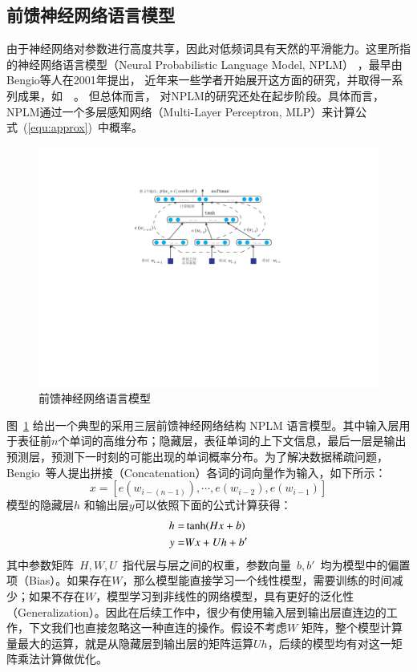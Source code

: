 \subsection{前馈神经网络语言模型}
由于神经网络对参数进行高度共享，因此对低频词具有天然的平滑能力。这里所指的神经网络语言模型（Neural Probabilistic Language Model, NPLM） ，最早由Bengio等人在2001年提出， 近年来一些学者开始展开这方面的研究，并取得一系列成果，如~\cite{DBLP:conf/acl/BaroniDK14,DBLP:journals/sigkdd/BellK07,DBLP:journals/pami/BengioCV13,DBLP:journals/tnn/BengioSF94}~。 但总体而言， 对NPLM的研究还处在起步阶段。具体而言，NPLM通过一个多层感知网络（Multi-Layer Perceptron, MLP）来计算公式~(\ref{equ:approx})~中概率。
\begin{figure}
  \centering
  \includegraphics[width=.85\linewidth]{./figures/nplm.pdf}
  \caption{前馈神经网络语言模型}\label{fig:nplm}
\end{figure}

图~\ref{fig:nplm} 给出一个典型的采用三层前馈神经网络结构 NPLM 语言模型。其中输入层用于表征前$n$个单词的高维分布；隐藏层，表征单词的上下文信息，最后一层是输出预测层，预测下一时刻的可能出现的单词概率分布。为了解决数据稀疏问题，Bengio~等人提出拼接（Concatenation）各词的词向量作为输入，如下所示：
\begin{equation}\label{equ:we}
  x = [e(w_{i-(n-1)}), \cdots , e(w_{i-2}), e{(w_{i-1})}]
\end{equation}
模型的隐藏层$h$ 和输出层$y$可以依照下面的公式计算获得：
\begin{equation}\label{equ:nplm}
\setlength{\abovedisplayskip}{6pt}
\setlength{\belowdisplayskip}{6pt}
\begin{split}
h =& \tanh(Hx+b) \\
y =&Wx + Uh +b'
\end{split}
\end{equation}
其中参数矩阵~$H,W,U$~指代层与层之间的权重，参数向量~$b,b'$~均为模型中的偏置项（Bias）。如果存在$W$，那么模型能直接学习一个线性模型，需要训练的时间减少；如果不存在$W$，模型学习到非线性的网络模型，具有更好的泛化性（Generalization）。因此在后续工作中，很少有使用输入层到输出层直连边的工作，下文我们也直接忽略这一种直连的操作。假设不考虑$W$ 矩阵，整个模型计算量最大的运算，就是从隐藏层到输出层的矩阵运算$Uh$，后续的模型均有对这一矩阵乘法计算做优化。

